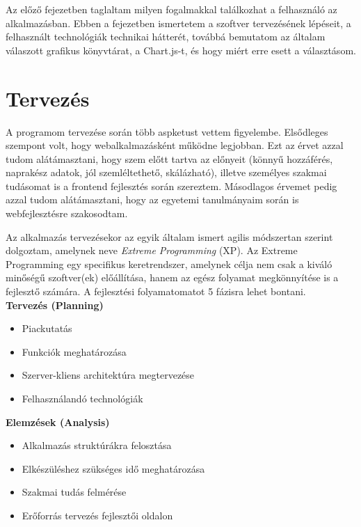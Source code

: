 
Az előző fejezetben taglaltam milyen fogalmakkal találkozhat a felhasználó az alkalmazásban. Ebben a fejezetben ismertetem a szoftver tervezésének lépéseit, a felhasznált technológiák technikai hátterét, továbbá bemutatom az általam válaszott grafikus könyvtárat, a Chart.js-t, és hogy miért erre esett a választásom.

\section{Tervezés  \label{fig:planning}}

A programom tervezése során több aspketust vettem figyelembe. Elsődleges szempont volt, hogy webalkalmazásként működne legjobban. Ezt az érvet azzal tudom alátámasztani, hogy szem előtt tartva az előnyeit (könnyű hozzáférés, naprakész adatok, jól szemléltethető, skálázható), illetve személyes szakmai tudásomat is a frontend fejlesztés során szereztem. Másodlagos érvemet pedig azzal tudom alátámasztani, hogy az egyetemi tanulmányaim során is webfejlesztésre szakosodtam.

	Az alkalmazás tervezésekor az egyik általam ismert agilis módszertan szerint dolgoztam, amelynek neve \emph{Extreme Programming} (XP). Az Extreme Programming egy specifikus keretrendszer, amelynek célja nem csak a kiváló minőségű szoftver(ek) előállítása, hanem az egész folyamat megkönnyítése is a fejlesztő számára.  A fejlesztési folyamatomatot 5 fázisra lehet bontani. \cite{agile} \\

\textbf{Tervezés (Planning)}
\begin{itemize}
\item Piackutatás
\item Funkciók meghatározása
\item Szerver-kliens architektúra megtervezése
\item Felhasználandó technológiák
\end{itemize}

\textbf{Elemzések (Analysis)}
\begin{itemize}
\item Alkalmazás struktúrákra felosztása
\item Elkészüléshez szükséges idő meghatározása
\item Szakmai tudás felmérése
\item Erőforrás tervezés fejlesztői oldalon
\end{itemize}

